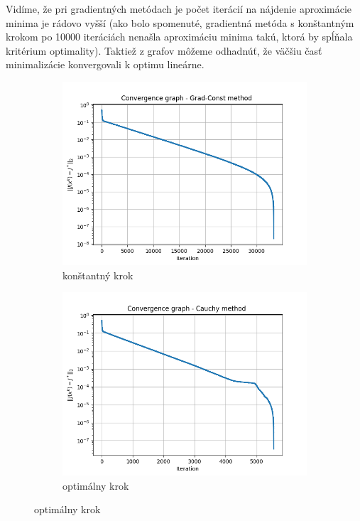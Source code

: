 \documentclass[report.tex]{subfiles}
\begin{document}
Vidíme, že pri gradientných metódach je počet iterácií na nájdenie aproximácie minima je rádovo vyšší (ako bolo spomenuté, gradientná metóda s konštantným krokom po 10000 iteráciách nenašla aproximáciu minima takú, ktorá by spĺňala kritérium optimality). Taktiež z grafov môžeme odhadnúť, že väčšiu časť minimalizácie konvergovali k optimu lineárne.

\begin{figure}[h!]
	\centering
	\begin{subfigure}[b]{0.4\linewidth}
		\includegraphics[width=\linewidth]{../../source/solvency_log_reg_results/Grad-Const.png}
		\caption{konštantný krok}
	\end{subfigure}
	\begin{subfigure}[b]{0.4\linewidth}
		\includegraphics[width=\linewidth]{../../source/solvency_log_reg_results/Cauchy.png}
		\caption{optimálny krok}
	\end{subfigure}
	\label{fig:gradient}
\end{figure}
\end{document}
